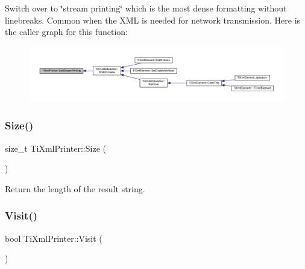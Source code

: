 Switch over to \char`\"{}stream printing\char`\"{} which is the most dense formatting without linebreaks. Common when the X\+ML is needed for network transmission. Here is the caller graph for this function\+:
\nopagebreak
\begin{figure}[H]
\begin{center}
\leavevmode
\includegraphics[width=350pt]{class_ti_xml_printer_ab23a90629e374cb1cadca090468bbd19_icgraph}
\end{center}
\end{figure}
\mbox{\label{class_ti_xml_printer_ad01375ae9199bd2f48252eaddce3039d}} 
\subsubsection{\texorpdfstring{Size()}{Size()}}
{\footnotesize\ttfamily size\+\_\+t Ti\+Xml\+Printer\+::\+Size (\begin{DoxyParamCaption}{ }\end{DoxyParamCaption})\hspace{0.3cm}{\ttfamily [inline]}}



Return the length of the result string. 

\mbox{\label{class_ti_xml_printer_adaf7eec4dc43ad071ff52b60361574f5}} 
\subsubsection{\texorpdfstring{Visit()}{Visit()}\hspace{0.1cm}{\footnotesize\ttfamily [1/4]}}
{\footnotesize\ttfamily bool Ti\+Xml\+Printer\+::\+Visit (\begin{DoxyParamCaption}\item[{const \hyperlink{class_ti_xml_declaration}{Ti\+Xml\+Declaration} \&}]{ }\end{DoxyParamCaption})\hspace{0.3cm}{\ttfamily [virtual]}}



